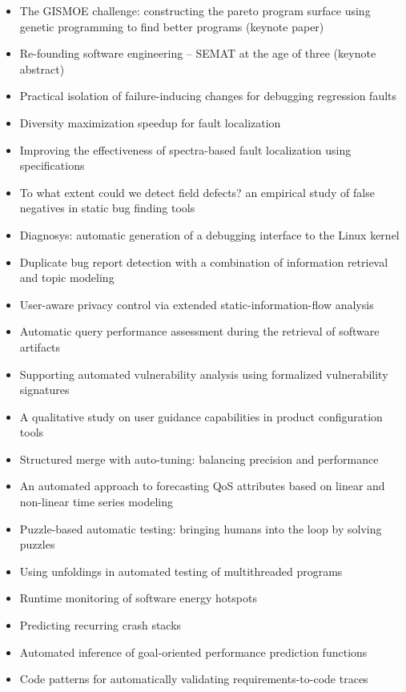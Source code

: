 {\small
\begin{itemize}[itemsep=-1ex]
  \item The GISMOE challenge: constructing the pareto program surface using genetic programming to find better programs (keynote paper)
  \item Re-founding software engineering -- SEMAT at the age of three (keynote abstract)
  \item Practical isolation of failure-inducing changes for debugging regression faults
  \item Diversity maximization speedup for fault localization
  \item Improving the effectiveness of spectra-based fault localization using specifications
  \item To what extent could we detect field defects? an empirical study of false negatives in static bug finding tools
  \item Diagnosys: automatic generation of a debugging interface to the Linux kernel
  \item Duplicate bug report detection with a combination of information retrieval and topic modeling
  \item User-aware privacy control via extended static-information-flow analysis
  \item Automatic query performance assessment during the retrieval of software artifacts
  \item Supporting automated vulnerability analysis using formalized vulnerability signatures
  \item A qualitative study on user guidance capabilities in product configuration tools
  \item Structured merge with auto-tuning: balancing precision and performance
  \item An automated approach to forecasting QoS attributes based on linear and non-linear time series modeling
  \item Puzzle-based automatic testing: bringing humans into the loop by solving puzzles
  \item Using unfoldings in automated testing of multithreaded programs
  \item Runtime monitoring of software energy hotspots
  \item Predicting recurring crash stacks
  \item Automated inference of goal-oriented performance prediction functions
  \item Code patterns for automatically validating requirements-to-code traces

\end{itemize}}
